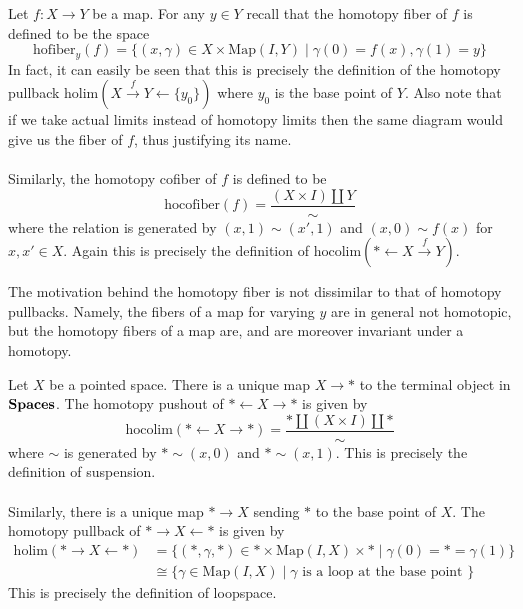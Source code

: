 \documentclass[a4paper]{article}
\begin{document}
\begin{eg}{}{} Let $f:X\to Y$ be a map. For any $y\in Y$ recall that the homotopy fiber of $f$ is defined to be the space $$\text{hofiber}_y(f)=\{(x,\gamma)\in X\times\text{Map}(I,Y)\;|\;\gamma(0)=f(x),\gamma(1)=y\}$$ In fact, it can easily be seen that this is precisely the definition of the homotopy pullback $\text{holim}(X\overset{f}{\rightarrow}Y\leftarrow\{y_0\})$ where $y_0$ is the base point of $Y$. Also note that if we take actual limits instead of homotopy limits then the same diagram would give us the fiber of $f$, thus justifying its name. \\~\\

Similarly, the homotopy cofiber of $f$ is defined to be $$\text{hocofiber}(f)=\frac{(X\times I)\amalg Y}{\sim}$$ where the relation is generated by $(x,1)\sim(x',1)$ and $(x,0)\sim f(x)$ for $x,x'\in X$. Again this is precisely the definition of $\text{hocolim}(\ast\leftarrow X\overset{f}{\rightarrow}Y)$. 
\end{eg}

The motivation behind the homotopy fiber is not dissimilar to that of homotopy pullbacks. Namely, the fibers of a map for varying $y$ are in general not homotopic, but the homotopy fibers of a map are, and are moreover invariant under a homotopy. 

\begin{eg}{}{} Let $X$ be a pointed space. There is a unique map $X\to\ast$ to the terminal object in $\bold{Spaces}$. The homotopy pushout of $\ast\leftarrow X\rightarrow\ast$ is given by $$\text{hocolim}(\ast\leftarrow X\rightarrow\ast)=\frac{\ast\amalg(X\times I)\amalg\ast}{\sim}$$ where $\sim$ is generated by $\ast\sim(x,0)$ and $\ast\sim(x,1)$. This is precisely the definition of suspension. \\~\\

Similarly, there is a unique map $\ast\to X$ sending $\ast$ to the base point of $X$. The homotopy pullback of $\ast\rightarrow X\leftarrow\ast$ is given by 
\begin{align*}
\text{holim}(\ast\rightarrow X\leftarrow\ast)&=\{(\ast,\gamma,\ast)\in\ast\times\text{Map}(I,X)\times\ast\;|\;\gamma(0)=\ast=\gamma(1)\}\\
&\cong\{\gamma\in\text{Map}(I,X)\;|\;\gamma\text{ is a loop at the base point }\}
\end{align*}
This is precisely the definition of loopspace. 
\end{eg}
\end{document}
